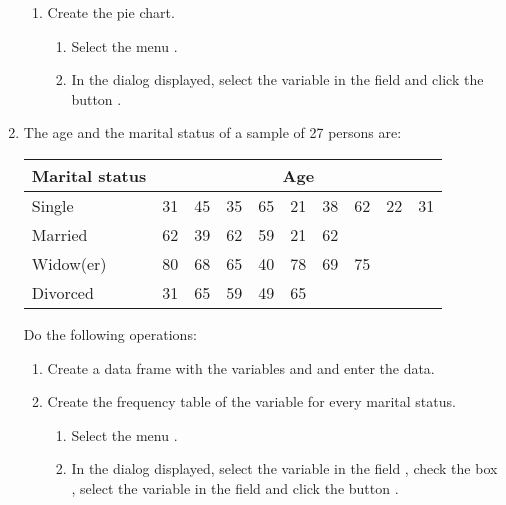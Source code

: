 \begin{enumerate}[leftmargin=*]
\begin{enumerate}
\item Create the pie chart.
\begin{indication}
\begin{enumerate}
\item Select the menu .
\item In the dialog displayed, select the variable  in the field  and click the
button .
\end{enumerate}
\end{indication}
\end{enumerate}

\item The age and the marital status of a sample of 27 persons are:
\begin{center}
\begin{tabular}{|l|rrrrrrrrr|}
\hline
Marital status & \multicolumn{9}{c|}{Age}\\
\hline
Single    & 31 & 45 & 35 & 65 & 21 & 38 & 62 & 22 & 31 \\
Married     & 62 & 39 & 62 & 59 & 21 & 62 &    &    &    \\
Widow(er)      & 80 & 68 & 65 & 40 & 78 & 69 & 75 &    &    \\
Divorced & 31 & 65 & 59 & 49 & 65 &    &    &    &    \\
\hline
\end{tabular}
\end{center}

Do the following operations:
\begin{enumerate}
\item Create a data frame with the variables  and  and enter the data.
\item Create the frequency table of the variable  for every marital status.
\begin{indication}
\begin{enumerate}
\item Select the menu .
\item In the dialog displayed, select the variable  in the field , check the box , select the variable  in the field
 and click the button .
\end{enumerate}
\end{indication}


\end{enumerate}
\end{enumerate}
